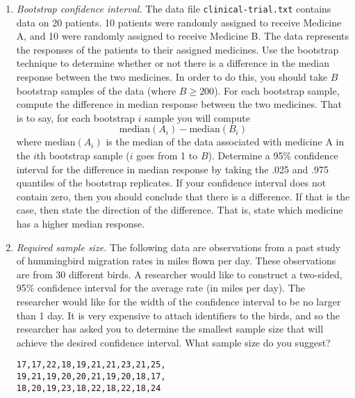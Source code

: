 \begin{enumerate}
\item \emph{Bootstrap confidence interval.} The data file
  \texttt{clinical-trial.txt} contains data on 20 patients. 10
  patients were randomly assigned to receive Medicine A, and 10 were
  randomly assigned to receive Medicine B. The data represents the
  responses of the patients to their assigned medicines. Use the
  bootstrap technique to determine whether or not there is a
  difference in the median response between the two medicines.  In
  order to do this, you should take $B$ bootstrap samples of the data
  (where $B \geq 200$). For each bootstrap sample, compute the
  difference in median response between the two medicines. That is to
  say, for each bootstrap $i$ sample you will compute
  \[
  \text{median}(A_i) - \text{median}(B_i)
  \]
  where $\text{median}(A_i)$ is the median of the data associated with
  medicine A in the $i$th bootstrap sample ($i$ goes from 1 to
  $B$). Determine a 95\% confidence interval for the difference in
  median response by taking the .025 and .975 quantiles of the
  bootstrap replicates. If your confidence interval does not contain
  zero, then you should conclude that there is a difference. If that
  is the case, then state the direction of the difference. That is,
  state which medicine has a higher median response. \label{ex:boot}


\item \emph{Required sample size.} The following data are observations
  from a past study of hummingbird migration rates in miles flown per
  day. These observations are from 30 different birds. A researcher
  would like to construct a two-sided, 95\% confidence interval for
  the average rate (in miles per day). The researcher would like for
  the width of the confidence interval to be no larger than 1 day. It
  is very expensive to attach identifiers to the birds, and so the
  researcher has asked you to determine the smallest sample size that
  will achieve the desired confidence interval. What sample size do
  you suggest?
\begin{Verbatim}[samepage=true]
17,17,22,18,19,21,21,23,21,25,
19,21,19,20,20,21,19,20,18,17,
18,20,19,23,18,22,18,22,18,24
\end{Verbatim}


\end{enumerate}
